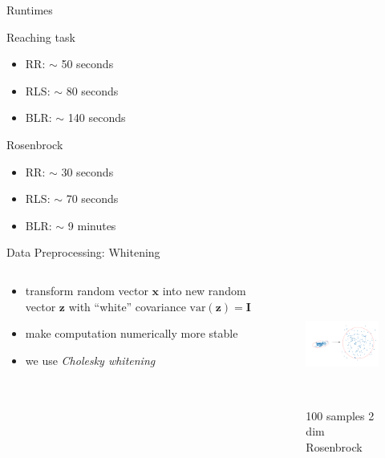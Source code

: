\documentclass[navbarinfooter, 12pt]{sdqbeamer}
\begin{document}
\begin{frame}{Runtimes}
\begin{block}{Reaching task}
  \begin{itemize}
  \item RR: $ \sim $ 50 seconds
  \item RLS: $ \sim $ 80 seconds
  \item BLR: $ \sim $ 140 seconds
  \end{itemize}
\end{block}
\begin{block}{Rosenbrock}
  \begin{itemize}
  \item RR: $ \sim $ 30 seconds
  \item RLS: $ \sim $ 70 seconds
  \item BLR: $ \sim $ 9 minutes
  \end{itemize}
\end{block}
\end{frame}


\begin{frame}{Data Preprocessing: Whitening}
\begin{columns}[c]
  \begin{column}{8cm}
    \begin{itemize}
    \item transform random vector $\mathbf{x}$ into new
      random vector $\mathbf{z}$
      with ``white'' covariance $\text{var}(\mathbf{z}) = \mathbf{I}$
    \item make computation numerically more stable

    \item we use \textit{Cholesky whitening}
    \end{itemize}
  \end{column}
  \begin{column}{6cm}
    \begin{figure}[h!]
      \includegraphics[height=4cm]{figures/white.png}
      \caption{100 samples 2 dim Rosenbrock}
     \end{figure}
   \end{column}
\end{columns}
\end{frame}
\end{document}
